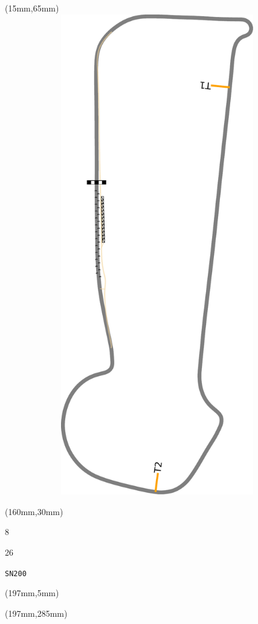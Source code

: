 \begin{textblock*}{185mm}(15mm,65mm)%
\centering
\mbox{\includegraphics[width=185mm,height=210mm,keepaspectratio]{PT/SN200.pdf}}
\end{textblock*}
\begin{textblock*}{40mm}(160mm,30mm)%
\Large
\par{} 
\par8 
\par26 
\par\hfill\tiny\tt SN200\\
\end{textblock*}
\begin{textblock*}{20mm}(197mm,5mm)%
\fbox{\thepage}
\label{SN200}
\end{textblock*}
\begin{textblock*}{20mm}(197mm,285mm)%
\fbox{\thepage}
\end{textblock*}

